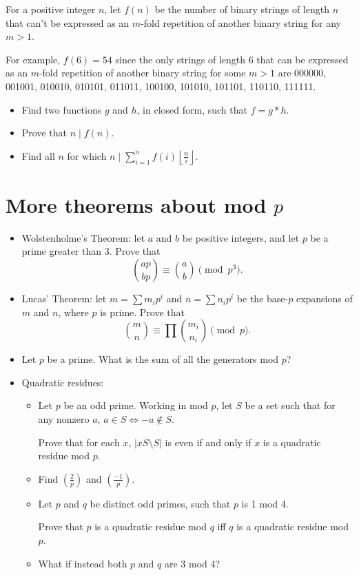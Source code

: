 \documentclass{article}
\begin{document}
  For a positive integer $n$, let $f(n)$ be the number of binary strings of length $n$ that
      can't be expressed as an $m$-fold repetition of another binary string for
      any $m>1$.

      For example, $f(6)=54$ since the only strings of length 6 that can be
      expressed as an $m$-fold repetition of another binary string for some $m>1$
      are 000000, 001001, 010010, 010101, 011011, 100100, 101010, 101101, 110110,
      111111.
       
      \begin{itemize}
        \item Find two functions $g$ and $h$, in closed form, such that $f=g*h$.
        \item 
          Prove that $n\mid f(n)$.
        \item Find all $n$ for which $n\mid\displaystyle\sum_{i=1}^n f(i)\left\lfloor\frac
              ni\right\rfloor$.
      \end{itemize}
\section{More theorems about mod $p$}
\begin{itemize}
  \item Wolstenholme's Theorem:
    let $a$ and $b$ be positive integers, and let $p$ be a prime greater
    than 3. Prove that \[\binom{ap}{bp}\equiv\binom ab\pmod {p^3}.\]
  \item Lucas' Theorem: let $m=\sum m_i p^i$ and $n=\sum n_i p^i$ be the base-$p$ expansions of
    $m$ and $n$, where $p$ is prime. Prove that
    \[\binom mn\equiv\prod{\binom{m_i}{n_i}}\pmod p.\]
  \item Let $p$ be a prime. What is the sum of all the generators mod $p$?
  \item Quadratic residues:
  \begin{itemize}
    \item Let $p$ be an odd prime. Working in mod $p$, let $S$ be a set such
      that for any nonzero $a$, $a\in S\iff -a\not\in S$.
      
      Prove that for each $x$, $\left|xS\setminus S\right|$ is even if and
      only if $x$ is a quadratic residue mod $p$.
    \item Find $\left(\frac 2p\right)$ and $\left(\frac{-1}p\right)$.
    \item Let $p$ and $q$ be distinct odd primes, such that $p$ is 1 mod 4.
    
      Prove that $p$ is a quadratic residue mod $q$ iff $q$ is a quadratic
      residue mod $p$.
    \item What if instead both $p$ and $q$ are 3 mod 4?
  \end{itemize}
\end{itemize}
\end{document}
